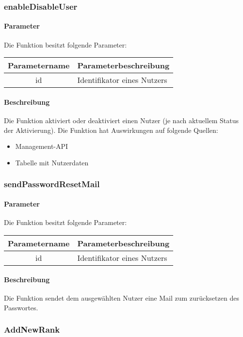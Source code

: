 \subsubsection{enableDisableUser}
\paragraph{Parameter} Die Funktion besitzt folgende Parameter:
\begin{table}[H]
	\begin{tabular}{|c|p{11cm}|}
		\hline
		\textbf{Parametername} & \textbf{Parameterbeschreibung} \\ \hline
		id & Identifikator eines Nutzers \\ \hline
	\end{tabular}
\end{table}
\paragraph{Beschreibung} Die Funktion aktiviert oder deaktiviert einen Nutzer (je nach aktuellem Status der Aktivierung). Die Funktion hat Auswirkungen auf folgende Quellen:
\begin{itemize}
	\item Management-API
	\item Tabelle mit Nutzerdaten
\end{itemize}
\subsubsection{sendPasswordResetMail}
\paragraph{Parameter} Die Funktion besitzt folgende Parameter:
\begin{table}[H]
	\begin{tabular}{|c|p{11cm}|}
		\hline
		\textbf{Parametername} & \textbf{Parameterbeschreibung} \\ \hline
		id & Identifikator eines Nutzers \\ \hline
	\end{tabular}
\end{table}
\paragraph{Beschreibung} Die Funktion sendet dem ausgewählten Nutzer eine Mail zum zurücksetzen des Passwortes.
\subsubsection{AddNewRank}

